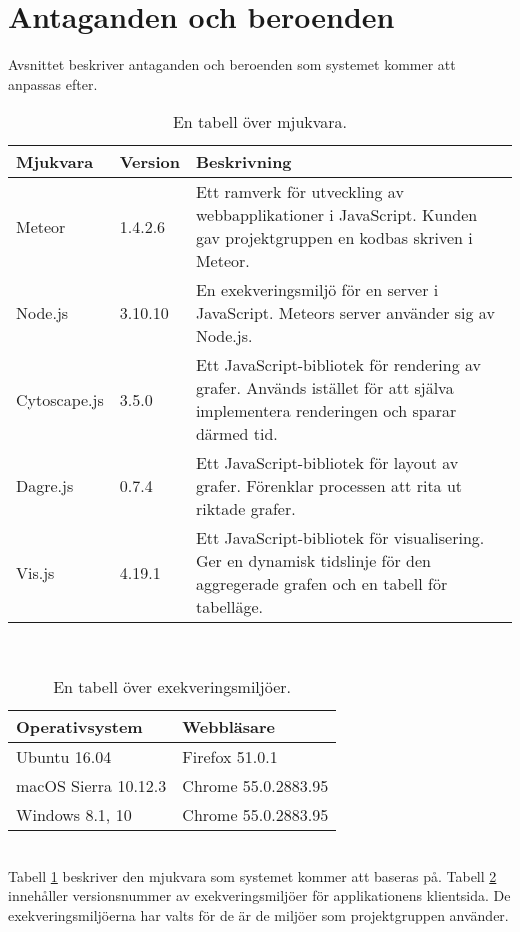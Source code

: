 \section{Antaganden och beroenden}
Avsnittet beskriver antaganden och beroenden som systemet kommer att anpassas efter.

\begin{table}[h!]
  \centering
  \caption{En tabell över mjukvara.}
  \def\arraystretch{1.5}
  \begin{adjustbox}{max width=\textwidth}
    \begin{tabularx}{\textwidth}{ | l | l | X | }
      \hline
      \textbf{Mjukvara} & \textbf{Version} & \textbf{Beskrivning} \\
      \hline
      Meteor & 1.4.2.6 & Ett ramverk för utveckling av webbapplikationer i JavaScript. Kunden gav projektgruppen en kodbas skriven i Meteor. \\ 
      \hline
      Node.js & 3.10.10 & En exekveringsmiljö för en server i JavaScript. Meteors server använder sig av Node.js.\\
      \hline
      Cytoscape.js & 3.5.0 & Ett JavaScript-bibliotek för rendering av grafer. Används istället för att själva implementera renderingen och sparar därmed tid.  \\
      \hline
      Dagre.js & 0.7.4 & Ett JavaScript-bibliotek för layout av grafer. Förenklar processen att rita ut riktade grafer. \\
      \hline
      Vis.js & 4.19.1 & Ett JavaScript-bibliotek för visualisering. Ger en dynamisk tidslinje för den aggregerade grafen och en tabell för tabelläge. \\
      \hline
    \end{tabularx}
  \end{adjustbox}
  \label{tab:mjukvara}
\end{table}
\


\begin{table}[h!]
  \centering
  \caption{En tabell över exekveringsmiljöer.}
  \def\arraystretch{1.5}
  \begin{adjustbox}{max width=\textwidth}
    \begin{tabularx}{\textwidth}{ | l | X | }
      \hline
      \textbf{Operativsystem} & \textbf{Webbläsare} \\
      \hline
      Ubuntu 16.04 & Firefox 51.0.1 \\
      \hline
      macOS Sierra 10.12.3 & Chrome 55.0.2883.95 \\
      \hline
      Windows 8.1, 10 & Chrome 55.0.2883.95 \\
      \hline
    \end{tabularx}
  \end{adjustbox}
  \label{tab:exekveringsmiljoer}
\end{table} 
\ \\
Tabell \ref{tab:mjukvara} beskriver den mjukvara som systemet kommer att baseras på. Tabell \ref{tab:exekveringsmiljoer} innehåller versionsnummer av exekveringsmiljöer för applikationens klientsida. De exekveringsmiljöerna har valts för de är de miljöer som projektgruppen använder. 